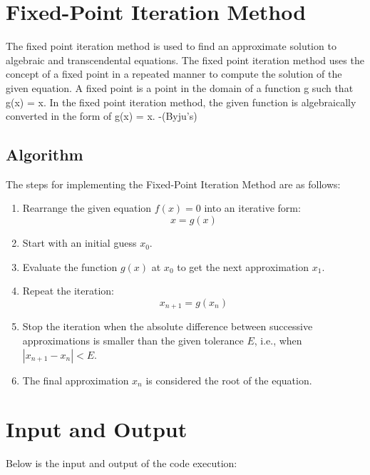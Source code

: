 \documentclass[12pt]{article}
\begin{document}
        \newpage
        \section*{Fixed-Point Iteration Method}

        The fixed point iteration method is used to find an approximate solution to algebraic and transcendental equations. The fixed point iteration method uses the concept of a fixed point in a repeated manner to compute the solution of the given equation. A fixed point is a point in the domain of a function g such that g(x) = x. In the fixed point iteration method, the given function is algebraically converted in the form of g(x) = x. -(Byju's)
            
        \subsection*{Algorithm}
        The steps for implementing the Fixed-Point Iteration Method are as follows:
            
        \begin{enumerate}
            \item Rearrange the given equation \( f(x) = 0 \) into an iterative form:
            \[
                x = g(x)
            \]
            \item Start with an initial guess \( x_0 \).
            \item Evaluate the function \( g(x) \) at \( x_0 \) to get the next approximation \( x_1 \).
            \item Repeat the iteration:
            \[
                x_{n+1} = g(x_n)
            \]
            \item Stop the iteration when the absolute difference between successive approximations is smaller than the given tolerance \( E \), i.e., when \( |x_{n+1} - x_n| < E \).
            \item The final approximation \( x_n \) is considered the root of the equation.
        \end{enumerate}
        
        \section*{Input and Output}
        
        \noindent Below is the input and output of the code execution:
        
\end{document}
